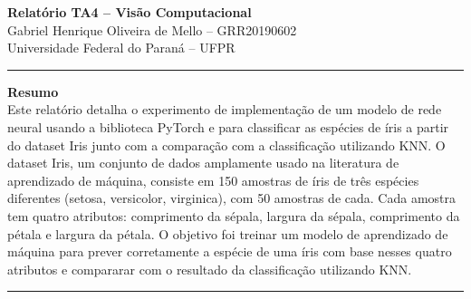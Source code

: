 \documentclass[a4paper,12pt]{article}
\renewenvironment{abstract}
 {\par\noindent\textbf{\abstractname}\ \ignorespaces \\}
 {\par\noindent\medskip}
\renewcommand{\abstractname}{Resumo}
\begin{document}
\pagestyle{fancy}
\thispagestyle{empty}
\fancyhead[L]{}
\renewcommand*{\thefootnote}{\fnsymbol{footnote}}
\begin{center}
\Large{\textbf{Relatório TA4 -- Visão Computacional}}
\vspace{0.4cm}
\normalsize
\\ Gabriel Henrique Oliveira de Mello -- GRR20190602 \\
\vspace{0.1cm}
\small{Universidade Federal do Paraná -- UFPR}
\medskip
\normalsize
\end{center}
{\color{gray}\hrule}
\vspace{0.4cm}
\begin{abstract}
Este relatório detalha o experimento de implementação de um modelo de rede neural usando a biblioteca PyTorch e para classificar as espécies de íris a partir do dataset Iris junto com a comparação com a classificação utilizando KNN.
O dataset Iris, um conjunto de dados amplamente usado na literatura de aprendizado de máquina, consiste em 150 amostras de íris de três espécies diferentes (setosa, versicolor, virginica), com 50 amostras de cada.
Cada amostra tem quatro atributos: comprimento da sépala, largura da sépala, comprimento da pétala e largura da pétala.
O objetivo foi treinar um modelo de aprendizado de máquina para prever corretamente a espécie de uma íris com base nesses quatro atributos e compararar com o resultado da classificação utilizando KNN.
\end{abstract}
{\color{gray}\hrule}
\medskip






\end{document}
